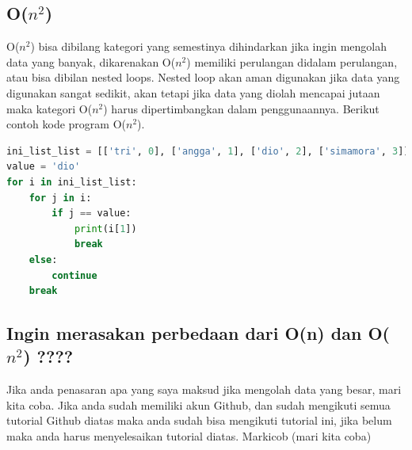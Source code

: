 \subsection{O($n^2$)}
O($n^2$) bisa dibilang kategori yang semestinya dihindarkan jika ingin mengolah data yang banyak, dikarenakan O($n^2$) memiliki perulangan didalam perulangan, atau bisa dibilan nested loops. Nested loop akan aman digunakan jika data yang digunakan sangat sedikit, akan tetapi jika data yang diolah mencapai jutaan maka kategori O($n^2$) harus dipertimbangkan dalam penggunaannya. Berikut contoh kode program O($n^2$).
\begin{lstlisting}[language=Python]
ini_list_list = [['tri', 0], ['angga', 1], ['dio', 2], ['simamora', 3]]
value = 'dio'
for i in ini_list_list:
    for j in i:
        if j == value:
            print(i[1])
            break
    else:
        continue
    break
\end{lstlisting}

\subsection{Ingin merasakan perbedaan dari O(n) dan O($n^2$) ????}
Jika anda penasaran apa yang saya maksud jika mengolah data yang besar, mari kita coba. Jika anda sudah memiliki akun Github, dan sudah mengikuti semua tutorial Github diatas maka anda sudah bisa mengikuti tutorial ini, jika belum maka anda harus menyelesaikan tutorial diatas. Markicob (mari kita coba)

